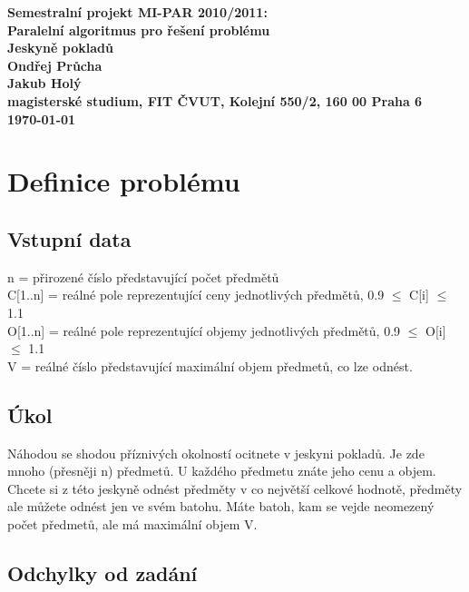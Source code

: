 \documentclass[12pt]{article}
\begin{document}

\begin{center}
\bf Semestralní projekt MI-PAR 2010/2011:\\[5mm]
    Paralelní algoritmus pro řešení problému\\[5mm]
    Jeskyně pokladů\\[5mm]
       Ondřej Průcha\\
       Jakub Holý\\[2mm]
magisterské studium, FIT ČVUT, Kolejní 550/2, 160 00 Praha 6\\[2mm]
\today
\end{center}

\section{Definice problému}

\subsection{Vstupní data}

n = přirozené číslo představující počet předmětů \\
C[1..n] = reálné pole reprezentující ceny jednotlivých předmětů, 0.9  $\leq$ C[i] $\leq$ 1.1 \\
O[1..n] = reálné pole reprezentující objemy jednotlivých předmětů, 0.9 $\leq$ O[i] $\leq$ 1.1 \\
V = reálné číslo představující maximální objem předmetů, co lze odnést.

\subsection{Úkol}

Náhodou se shodou příznivých okolností ocitnete v jeskyni pokladů. Je zde mnoho (přesněji n) předmetů. U každého předmetu znáte jeho cenu a objem. Chcete si z této jeskyně odnést předměty v co největší celkové hodnotě, předměty ale můžete odnést jen ve svém batohu. Máte batoh, kam se vejde neomezený počet předmetů, ale má maximální objem V.

\subsection{Odchylky od zadání}
\end{document}
